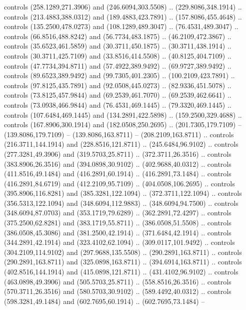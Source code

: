 {{\begin{scope}[y=-0.80pt,x=0.80pt,scale=0.038,xshift=-250pt,yshift=220pt]
        controls (258.1289,271.3906) and (246.6094,303.5508) .. (229.8086,348.1914) ..
        controls (213.4883,388.0312) and (189.4883,423.7891) .. (157.8086,455.4648) ..
        controls (135.2500,478.0273) and (108.1289,489.3047) .. (76.4531,489.3047) ..
        controls (66.8516,488.8242) and (56.7734,483.1875) .. (46.2109,472.3867) ..
        controls (35.6523,461.5859) and (30.3711,450.1875) .. (30.3711,438.1914) ..
        controls (30.3711,425.7109) and (33.8516,414.5508) .. (40.8125,404.7109) ..
        controls (47.7734,394.8711) and (57.4922,389.9492) .. (69.9727,389.9492) ..
        controls (89.6523,389.9492) and (99.7305,401.2305) .. (100.2109,423.7891) ..
        controls (97.8125,435.7891) and (92.0508,445.0273) .. (82.9336,451.5078) ..
        controls (73.8125,457.9844) and (69.2539,461.7070) .. (69.2539,462.6641) ..
        controls (73.0938,466.9844) and (76.4531,469.1445) .. (79.3320,469.1445) ..
        controls (107.6484,469.1445) and (134.2891,422.5898) .. (159.2500,329.4688) ..
        controls (167.8906,300.1914) and (182.0508,250.2695) .. (201.7305,179.7109) --
        (139.8086,179.7109) -- (139.8086,163.8711) -- (208.2109,163.8711) .. controls
        (216.3711,144.1914) and (228.8516,121.8711) .. (245.6484,96.9102) .. controls
        (277.3281,49.3906) and (319.5703,25.8711) .. (372.3711,26.3516) .. controls
        (383.8906,26.3516) and (394.0898,30.9102) .. (402.9688,40.0312) .. controls
        (411.8516,49.1484) and (416.2891,60.1914) .. (416.2891,73.1484) .. controls
        (416.2891,84.6719) and (412.2109,95.7109) .. (404.0508,106.2695) .. controls
        (395.8906,116.8281) and (385.3281,122.1094) .. (372.3711,122.1094) .. controls
        (356.5313,122.1094) and (348.6094,112.9883) .. (348.6094,94.7500) .. controls
        (348.6094,87.0703) and (353.1719,79.6289) .. (362.2891,72.4297) .. controls
        (375.2500,62.8281) and (383.1719,55.8711) .. (386.0508,51.5508) .. controls
        (386.0508,45.3086) and (381.2500,42.1914) .. (371.6484,42.1914) .. controls
        (344.2891,42.1914) and (323.4102,62.1094) .. (309.0117,101.9492) .. controls
        (304.2109,114.9102) and (297.9688,135.5508) .. (290.2891,163.8711) .. controls
        (290.2891,163.8711) and (325.0898,163.8711) .. (394.6914,163.8711) .. controls
        (402.8516,144.1914) and (415.0898,121.8711) .. (431.4102,96.9102) .. controls
        (463.0898,49.3906) and (505.5703,25.8711) .. (558.8516,26.3516) .. controls
        (570.3711,26.3516) and (580.5703,30.9102) .. (589.4492,40.0312) .. controls
        (598.3281,49.1484) and (602.7695,60.1914) .. (602.7695,73.1484) --

\end{scope}}}
